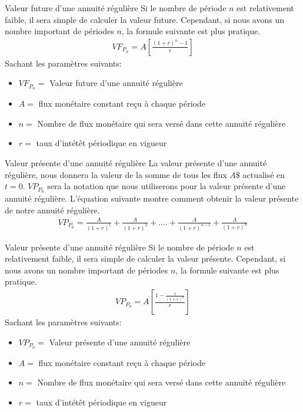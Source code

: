 \documentclass{beamer}
\begin{document}
\begin{frame}{Valeur future d'une annuité régulière}
Si le nombre de période $n$ est relativement faible, il sera simple de calculer la valeur future. Cependant, si nous avons un nombre important de périodes $n$, la formule suivante est plus pratique. 
\begin{align*}
VF_{P_n}=A \left[\frac{(1+r)^n-1}{r} \right]
\end{align*}
Sachant les paramètres suivants: 
\begin{itemize}
\item $VF_{P_n}=$ Valeur future d'une annuité régulière 
\item $A=$ flux monétaire constant reçu à chaque période  
\item $n=$ Nombre de flux monétaire qui sera versé dans cette annuité régulière
\item $r=$ taux d'intétêt périodique en vigueur 
\end{itemize}
\end{frame}



\begin{frame}{Valeur présente d'une annuité régulière}
La valeur présente d'une annuité régulière, nous donnera la valeur de la somme de tous les flux $A\$$ actualisé en $t=0$. $VP_{P_0}$ sera la notation que nous utiliserons pour la valeur présente d'une annuité régulière. L'équation suivante montre comment obtenir la valeur présente de notre annuité régulière.  
\begin{align*}
VP_{P_0} = \frac{A}{(1+r)^{1}}+\frac{A}{(1+r)^{2}}+....+\frac{A}{(1+r)^{n-1}}+\frac{A}{(1+r)^{n}}
\end{align*}
\end{frame}


\begin{frame}{Valeur présente d'une annuité régulière}
Si le nombre de période $n$ est relativement faible, il sera simple de calculer la valeur présente. Cependant, si nous avons un nombre important de périodes $n$, la formule suivante est plus pratique. 
\begin{align*}
VP_{P_0}=A \left[ \frac{1-\frac{1}{(1+r)^n}}{r} \right]
\end{align*}
Sachant les paramètres suivants: 
\begin{itemize}
\item $VP_{P_0}=$ Valeur présente d'une annuité régulière 
\item $A=$ flux monétaire constant reçu à chaque période  
\item $n=$ Nombre de flux monétaire qui sera versé dans cette annuité régulière
\item $r=$ taux d'intétêt périodique en vigueur 
\end{itemize}
\end{frame}
\end{document}
